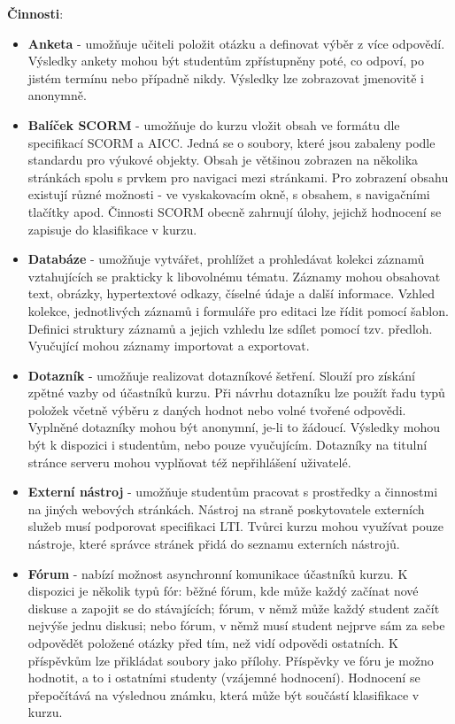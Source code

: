 \documentclass[
print,
  11pt,
  table,   
  nolof,    
  nolot,
  oneside,
  draft
]{fithesis3}
\begin{document}
\textbf{Činnosti}:
\begin{itemize}
\item \textbf{Anketa} - umožňuje učiteli položit otázku a definovat výběr z více odpovědí. Výsledky ankety mohou být studentům zpřístupněny poté, co odpoví, po jistém termínu nebo případně nikdy. Výsledky lze zobrazovat jmenovitě i anonymně.
\item \textbf{Balíček SCORM} - umožňuje do kurzu vložit obsah ve formátu dle specifikací SCORM a AICC. Jedná se o soubory, které jsou zabaleny podle standardu pro výukové objekty. Obsah je většinou zobrazen na několika stránkách spolu s prvkem pro navigaci mezi stránkami. Pro zobrazení obsahu existují různé možnosti - ve vyskakovacím okně, s obsahem, s navigačními tlačítky apod. Činnosti SCORM obecně zahrnují úlohy, jejichž hodnocení se zapisuje do klasifikace v kurzu.
\item \textbf{Databáze} - umožňuje vytvářet, prohlížet a prohledávat kolekci záznamů vztahujících se prakticky k libovolnému tématu. Záznamy mohou obsahovat text, obrázky, hypertextové odkazy, číselné údaje a další informace. Vzhled kolekce, jednotlivých záznamů i formuláře pro editaci lze řídit pomocí šablon. Definici struktury záznamů a jejich vzhledu lze sdílet pomocí tzv. předloh. Vyučující mohou záznamy importovat a exportovat.
\item \textbf{Dotazník} - umožňuje realizovat dotazníkové šetření. Slouží pro získání zpětné vazby od účastníků kurzu. Při návrhu dotazníku lze použít řadu typů položek včetně výběru z daných hodnot nebo volné tvořené odpovědi. Vyplněné dotazníky mohou být anonymní, je-li to žádoucí. Výsledky mohou být k dispozici i studentům, nebo pouze vyučujícím. Dotazníky na titulní stránce serveru mohou vyplňovat též nepřihlášení uživatelé.
\item \textbf{Externí nástroj} - umožňuje studentům pracovat s prostředky a činnostmi na jiných webových stránkách. Nástroj na straně poskytovatele externích služeb musí podporovat specifikaci LTI. Tvůrci kurzu mohou využívat pouze nástroje, které správce stránek přidá do seznamu externích nástrojů.
\item \textbf{Fórum} - nabízí možnost asynchronní komunikace účastníků kurzu. K dispozici je několik typů fór: běžné fórum, kde může každý začínat nové diskuse a zapojit se do stávajících; fórum, v němž může každý student začít nejvýše jednu diskusi; nebo fórum, v němž musí student nejprve sám za sebe odpovědět položené otázky před tím, než vidí odpovědi ostatních. K příspěvkům lze přikládat soubory jako přílohy. Příspěvky ve fóru je možno hodnotit, a to i ostatními studenty (vzájemné hodnocení). Hodnocení se přepočítává na výslednou známku, která může být součástí klasifikace v kurzu.

\end{itemize}
\end{document}
